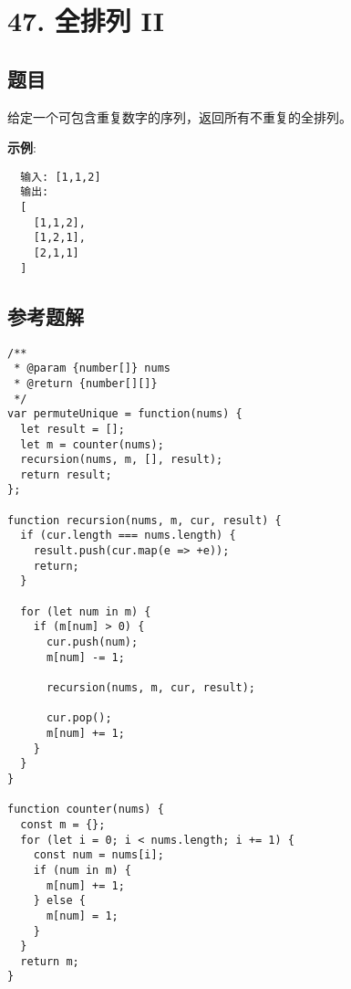 \newpage
\section{47. 全排列 II}
\label{leetcode:47}

\subsection{题目}

给定一个可包含重复数字的序列，返回所有不重复的全排列。

\textbf{示例}:

\begin{verbatim}
  输入: [1,1,2]
  输出:
  [
    [1,1,2],
    [1,2,1],
    [2,1,1]
  ]
\end{verbatim}

\subsection{参考题解}

\begin{verbatim}
/**
 * @param {number[]} nums
 * @return {number[][]}
 */
var permuteUnique = function(nums) {
  let result = [];
  let m = counter(nums);
  recursion(nums, m, [], result);
  return result;
};

function recursion(nums, m, cur, result) {
  if (cur.length === nums.length) {
    result.push(cur.map(e => +e));
    return;
  }

  for (let num in m) {
    if (m[num] > 0) {
      cur.push(num);
      m[num] -= 1;

      recursion(nums, m, cur, result);

      cur.pop();
      m[num] += 1;
    }
  }
}

function counter(nums) {
  const m = {};
  for (let i = 0; i < nums.length; i += 1) {
    const num = nums[i];
    if (num in m) {
      m[num] += 1;
    } else {
      m[num] = 1;
    }
  }
  return m;
}
\end{verbatim}